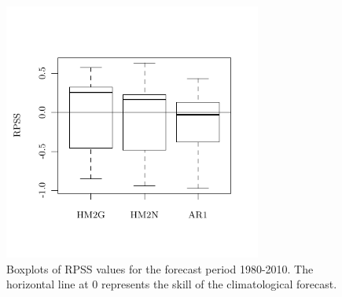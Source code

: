 \documentclass[wrr]{AGUTeX}
\begin{document}
\begin{figure}
\centering
\noindent\includegraphics[width=20pc]{plots/hmm-sim-figure10.pdf}
\caption{Boxplots of RPSS values for the forecast period 1980-2010. The horizontal line at 0 represents the skill of the climatological forecast.}\label{fig:rpss}
\end{figure}
\end{document}
